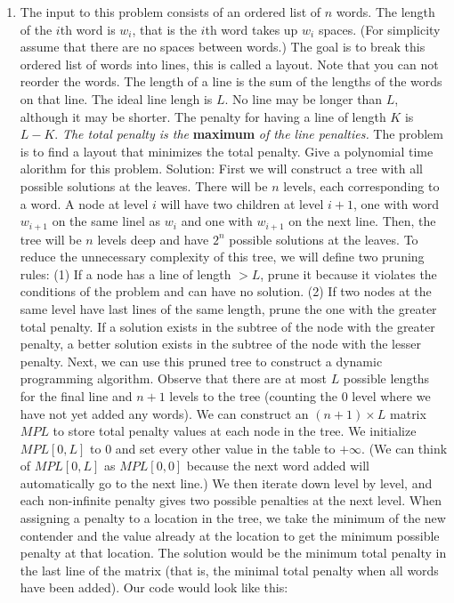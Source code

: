 \documentclass{article}
\begin{document}
\begin{enumerate}
\item The input to this problem consists of an ordered list of $n$ words. The length of the $i$th word is $w_i$, that is the $i$th word takes up $w_i$ spaces. (For simplicity assume that there are no spaces between words.) The goal is to break this ordered list of words into lines, this is called a layout. Note that you can not reorder the words. The length of a line is the sum of the lengths of the words on that line. The ideal line lengh is $L$. No line may be longer than $L$, although it may be shorter. The penalty for having a line of length $K$ is $L-K$. \emph{The total penalty is the} \textbf{maximum} \emph{of the line penalties.} The problem is to find a layout that minimizes the total penalty. Give a polynomial time alorithm for this problem.
\newline
\newline Solution: First we will construct a tree with all possible solutions at the leaves. There will be $n$ levels, each corresponding to a word. A node at level $i$ will have two children at level $i+1$, one with word $w_{i+1}$ on the same linel as $w_{i}$ and one with $w_{i+1}$ on the next line. Then, the tree will be $n$ levels deep and have $2^n$ possible solutions at the leaves.  To reduce the unnecessary complexity of this tree, we will define two pruning rules:
\newline (1) If a node has a line of length $>L$, prune it because it violates the conditions of the problem and can have no solution.
\newline (2) If two nodes at the same level have last lines of the same length, prune the one with the greater total penalty.  If a solution exists in the subtree of the node with the greater penalty, a better solution exists in the subtree of the node with the lesser penalty.
\newline
\newline Next, we can use this pruned tree to construct a dynamic programming algorithm. Observe that there are at most $L$ possible lengths for the final line and $n+1$ levels to the tree (counting the 0 level where we have not yet added any words). We can construct an $(n+1)\times L$ matrix $MPL$ to store total penalty values at each node in the tree. We initialize $MPL[0,L]$ to 0 and set every other value in the table to $+\infty $. (We can think of $MPL[0,L]$ as $MPL[0,0]$ because the next word added will automatically go to the next line.) We then iterate down level by level, and each non-infinite penalty gives two possible penalties at the next level.  When assigning a penalty to a location in the tree, we take the minimum of the new contender and the value already at the location to get the minimum possible penalty at that location. The solution would be the minimum total penalty in the last line of the matrix (that is, the minimal total penalty when all words have been added). Our code would look like this:

\end{enumerate}
\end{document}
